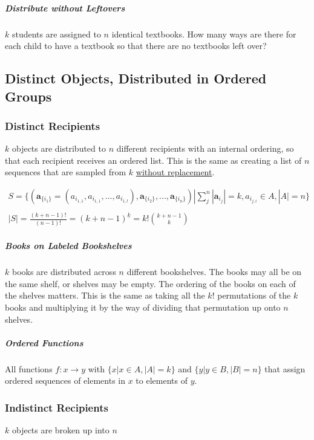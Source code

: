 \subparagraph{Distribute without Leftovers} $k$ students are assigned to $n$ identical textbooks. How many ways are there for each child to have a textbook so that there are no textbooks left over? 


\subsection{Distinct Objects, Distributed in Ordered Groups}

\subsubsection{Distinct Recipients}
$k$ objects are distributed to $n$ different recipients with an internal ordering, so that each recipient receives an ordered list. This is the same as creating a list of $n$ sequences that are sampled from $k$ \underline{without replacement}. 

\begin{equation}
\begin{array}{l}
S = \{ (\mathbf{a}_{\{i_1\}}  = ( a_{i_{1,1}},a_{i_{1,1}},...,a_{i_{1,l}} ),\mathbf{a}_{\{i_2\}},...,\mathbf{a}_{\{i_n\}}) | \sum^n_j |\mathbf{a}_{i_j}| = k, a_{i_{j,i}} \in A, |A| = n \} \\
\\
|S| = \frac{(k + n - 1)!}{(n-1)!} = ( k+n-1)^{\underline{k}} = k! {k+n-1 \choose k}
\end{array}
\end{equation}


\subparagraph{Books on Labeled Bookshelves} $k$ books are distributed across $n$ different bookshelves. The books may all be on the same shelf, or shelves may be empty. The ordering of the books on each of the shelves matters. This is the same as taking all the $k!$ permutations of the $k$ books and multiplying it by the way of dividing that permutation up onto $n$ shelves. 

\subparagraph{Ordered Functions}  All functions $f: x \rightarrow y$ with $\{x | x\in A, |A| = k \}$ and $\{y | y\in B, |B| = n\}$ that assign ordered sequences of elements in $x$ to elements of $y$.

\subsubsection{Indistinct Recipients}
$k$ objects are broken up into $n$ 

